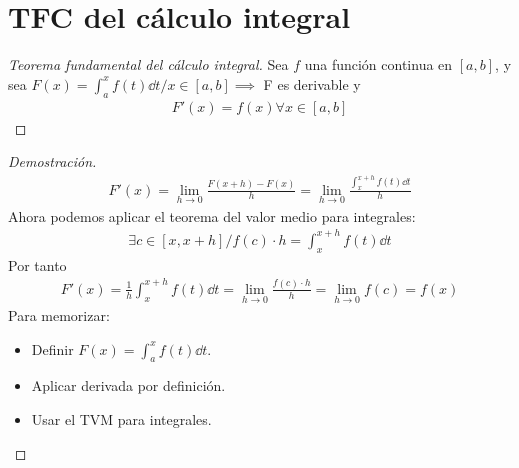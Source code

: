 \documentclass{article}
\begin{document}
\section{TFC del cálculo integral}
\begin{proof}[Teorema fundamental del cálculo integral]
    Sea $f$ una función continua en $[a,b]$, y sea $F(x)= \int _{a}^x f(t) \dd{t} / x \in [a,b] \implies $ F es
    derivable y
    \begin{equation}
        \begin{split}
            F'(x)=f(x) \forall x \in [a,b]
        \end{split}
    \end{equation}
\end{proof}
\begin{proof}[Demostración]
    \begin{equation}
        \begin{split}
            F'(x) = \lim_{h \to 0} \frac{F(x+h) - F(x)}{h} = \lim_{h \to 0} \frac{ \int _{x}^{x+h} f(t) \dd{t}}{h}
        \end{split}
    \end{equation}
    Ahora podemos aplicar el teorema del valor medio para integrales:
    \begin{equation}
        \begin{split}
            \exists c \in [x,x+h] / f(c) \cdot h = \int _{x}^{x+h}f(t) \dd{t}
        \end{split}
    \end{equation}
    Por tanto
    \begin{equation}
        \begin{split}
            F'(x)= \frac{1}{h} \int _{x}^{x+h} f(t) \dd{t} = \lim_{h \to 0} \frac{f(c) \cdot h}{h}=\lim_{h \to 0}f(c)
            =f(x)
        \end{split}
    \end{equation}
Para memorizar:
\begin{itemize}
	\item Definir \(F(x) = \int_a^x f(t) \dd{t}\).
	\item Aplicar derivada por definición.
	\item Usar el TVM para integrales.
\end{itemize}
\end{proof}
\end{document}
